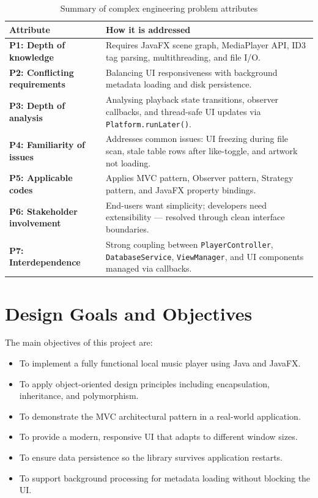 ﻿\documentclass[12pt]{report}
\begin{document}
\begin{table}[htbp]
   \centering
    \caption{Summary of complex engineering problem attributes}
    \begin{tabular}{|p{5.5cm}|p{8.5cm}|}
    \toprule
        \textbf{Attribute} & \textbf{How it is addressed} \\
    \midrule
    \textbf{P1: Depth of knowledge} & Requires JavaFX scene graph, MediaPlayer API, ID3 tag parsing, multithreading, and file I/O. \\ \hline
    \textbf{P2: Conflicting requirements} & Balancing UI responsiveness with background metadata loading and disk persistence. \\ \hline
    \textbf{P3: Depth of analysis} & Analysing playback state transitions, observer callbacks, and thread-safe UI updates via \texttt{Platform.runLater()}. \\ \hline
    \textbf{P4: Familiarity of issues} & Addresses common issues: UI freezing during file scan, stale table rows after like-toggle, and artwork not loading. \\ \hline
    \textbf{P5: Applicable codes} & Applies MVC pattern, Observer pattern, Strategy pattern, and JavaFX property bindings. \\ \hline
    \textbf{P6: Stakeholder involvement} & End-users want simplicity; developers need extensibility --- resolved through clean interface boundaries. \\ \hline
    \textbf{P7: Interdependence} & Strong coupling between \texttt{PlayerController}, \texttt{DatabaseService}, \texttt{ViewManager}, and UI components managed via callbacks. \\ \hline
    \end{tabular}
    \label{tab:CEP}
\end{table}

\section{Design Goals and Objectives}
The main objectives of this project are:
\begin{itemize}
    \item To implement a fully functional local music player using Java and JavaFX.
    \item To apply object-oriented design principles including encapsulation, inheritance, and polymorphism.
    \item To demonstrate the MVC architectural pattern in a real-world application.
    \item To provide a modern, responsive UI that adapts to different window sizes.
    \item To ensure data persistence so the library survives application restarts.
    \item To support background processing for metadata loading without blocking the UI.
\end{itemize}
\end{document}
